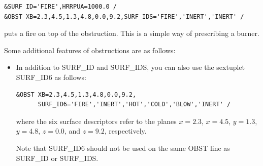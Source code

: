 \documentclass[11pt]{book}
\begin{document}
\footnotesize
\begin{verbatim}
&SURF ID='FIRE',HRRPUA=1000.0 /
&OBST XB=2.3,4.5,1.3,4.8,0.0,9.2,SURF_IDS='FIRE','INERT','INERT' /
\end{verbatim}
\normalsize
puts a fire on top of the obstruction. This is a simple way of
prescribing a burner.

\noindent
Some additional features of obstructions are as follows:
\begin{itemize}
\item In addition to {\ct SURF\_ID} and {\ct SURF\_IDS}, you can also use
the sextuplet {\ct SURF\_ID6} as follows:

\footnotesize
\begin{verbatim}
&OBST XB=2.3,4.5,1.3,4.8,0.0,9.2,
      SURF_ID6='FIRE','INERT','HOT','COLD','BLOW','INERT' /
\end{verbatim}
\normalsize
where the six surface descriptors refer to the planes $x=2.3$, $x=4.5$, $y=1.3$, $y=4.8$,
$z=0.0$, and $z=9.2$, respectively.

\begin{warning}
\noindent
Note that {\ct SURF\_ID6} should not be used on the same {\ct OBST}
line as {\ct SURF\_ID} or {\ct SURF\_IDS}.
\end{warning}


\end{itemize}
\end{document}
